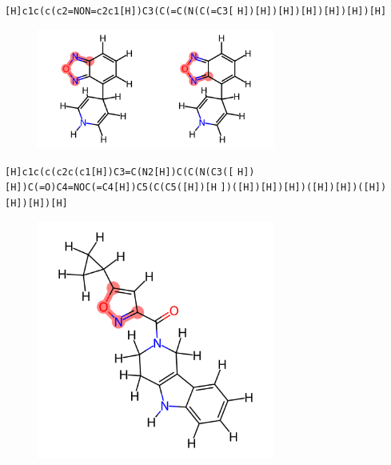 \documentclass{beamer}
\begin{document}
\begin{frame}[fragile]
\verb|[H]c1c(c(c2=NON=c2c1[H])C3(C(=C(N(C(=C3[|
\verb|H])[H])[H])[H])[H])[H])[H]|

\begin{figure}
    \includegraphics[width=0.7\textwidth,height=0.7\textheight,keepaspectratio]{mol10.png}
\end{figure}
\end{frame}
\begin{frame}[fragile]
\verb|[H]c1c(c(c2c(c1[H])C3=C(N2[H])C(C(N(C3([|
\verb|H])[H])C(=O)C4=NOC(=C4[H])C5(C(C5([H])[H|
\verb|])([H])[H])[H])([H])[H])([H])[H])[H])[H]|

\begin{figure}
    \includegraphics[width=0.7\textwidth,height=0.7\textheight,keepaspectratio]{mol11.png}
\end{figure}
\end{frame}
\end{document}
